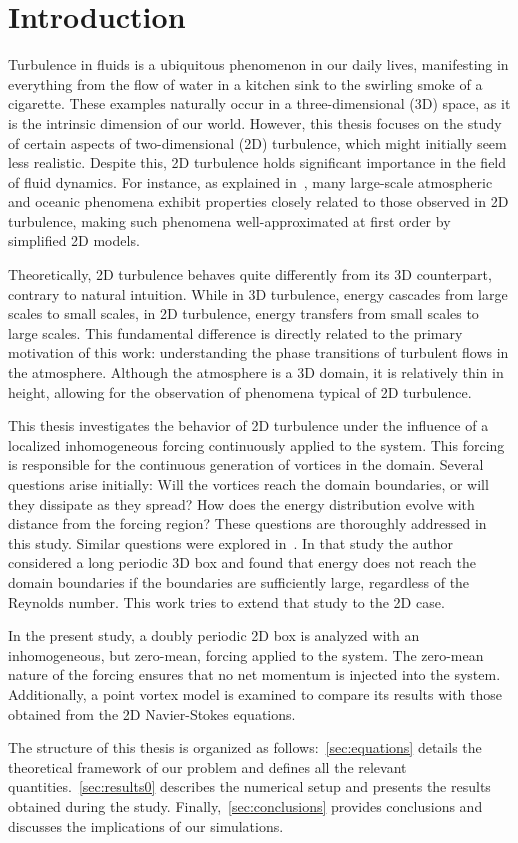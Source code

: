 \documentclass[../main.tex]{subfiles}
\begin{document}
\section{Introduction}
Turbulence in fluids is a ubiquitous phenomenon in our daily lives, manifesting in everything from the flow of water in a kitchen sink to the swirling smoke of a cigarette. These examples naturally occur in a three-dimensional (3D) space, as it is the intrinsic dimension of our world. However, this thesis focuses on the study of certain aspects of two-dimensional (2D) turbulence, which might initially seem less realistic. Despite this, 2D turbulence holds significant importance in the field of fluid dynamics. For instance, as explained in~\cite{2dturbulence}, many large-scale atmospheric and oceanic phenomena exhibit properties closely related to those observed in 2D turbulence, making such phenomena well-approximated at first order by simplified 2D models.

Theoretically, 2D turbulence behaves quite differently from its 3D counterpart, contrary to natural intuition. While in 3D turbulence, energy cascades from large scales to small scales, in 2D turbulence, energy transfers from small scales to large scales. This fundamental difference is directly related to the primary motivation of this work: understanding the phase transitions of turbulent flows in the atmosphere. Although the atmosphere is a 3D domain, it is relatively thin in height, allowing for the observation of phenomena typical of 2D turbulence.

This thesis investigates the behavior of 2D turbulence under the influence of a localized inhomogeneous forcing continuously applied to the system. This forcing is responsible for the continuous generation of vortices in the domain. Several questions arise initially: Will the vortices reach the domain boundaries, or will they dissipate as they spread? How does the energy distribution evolve with distance from the forcing region? These questions are thoroughly addressed in this study. Similar questions were explored in~\cite{alexakis}. In that study
the author considered a long periodic 3D box and found that energy does not reach the domain boundaries if the boundaries are sufficiently large, regardless of the Reynolds number. This work tries to extend that study to the 2D case.

In the present study, a doubly periodic 2D box is analyzed with an inhomogeneous, but zero-mean, forcing applied to the system. The zero-mean nature of the forcing ensures that no net momentum is injected into the system. Additionally, a point vortex model is examined to compare its results with those obtained from the 2D Navier-Stokes equations.

The structure of this thesis is organized as follows:~\cref{sec:equations} details the theoretical framework of our problem and defines all the relevant quantities.~\cref{sec:results0} describes the numerical setup and presents the results obtained during the study. Finally,~\cref{sec:conclusions} provides conclusions and discusses the implications of our simulations.
\end{document}
